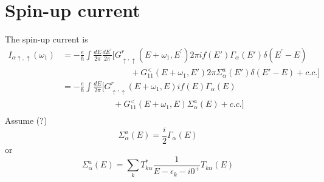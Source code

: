 \documentclass[11pt,a4paper]{article}
\begin{document}
\section{Spin-up current}
The spin-up current is
\begin{equation}
\begin{split}
I_{\alpha\uparrow,\uparrow}(\omega_{1})&=-\frac{e}{\hbar}\int \frac{d E}{2 \pi} \frac{d E^{\prime}}{2 \pi} [G_{\uparrow,\uparrow}^{r}\left(E+\omega_{1}, E^{\prime}\right) 2\pi if(E')\Gamma_{\alpha}(E')\delta(E^{\prime}- E) \\
&\qquad\qquad\qquad\qquad + G_{11}^{<}(E+\omega_{1}, E')2\pi\Sigma_{\alpha}^{a}(E')\delta(E'-E) + c.c. ]\\
&=-\frac{e}{\hbar}\int \frac{d E}{2 \pi}  [G_{\uparrow,\uparrow}^{r}\left(E+\omega_{1}, E\right) if(E)\Gamma_{\alpha}(E) \\
&\qquad\qquad\qquad + G_{11}^{<}(E+\omega_{1}, E)\Sigma_{\alpha}^{a}(E) + c.c. ] \\
\end{split}
\end{equation}
Assume (?)
\begin{equation}
\Sigma_{\alpha}^{a}(E) = \frac{i}{2}\Gamma_{\alpha}(E)
\end{equation}
or
\begin{equation}
\Sigma_{\alpha}^{a}(E)=\sum_{k} T_{k \alpha}^{*} \frac{1}{E-\epsilon_{k}-i0^{+}} T_{k \alpha}(E)
\end{equation}





\newpage
\end{document}
